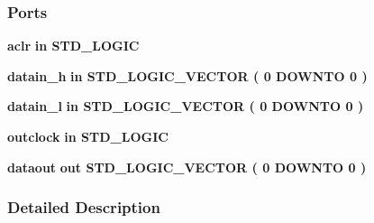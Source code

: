 \subsubsection*{Ports}
 \begin{DoxyCompactItemize}
\item 
{\bf aclr}  {\bfseries {\bfseries \textcolor{keywordflow}{in}\textcolor{vhdlchar}{ }}} {\bfseries \textcolor{comment}{S\+T\+D\+\_\+\+L\+O\+G\+IC}\textcolor{vhdlchar}{ }} 
\item 
{\bf datain\+\_\+h}  {\bfseries {\bfseries \textcolor{keywordflow}{in}\textcolor{vhdlchar}{ }}} {\bfseries \textcolor{comment}{S\+T\+D\+\_\+\+L\+O\+G\+I\+C\+\_\+\+V\+E\+C\+T\+OR}\textcolor{vhdlchar}{ }\textcolor{vhdlchar}{(}\textcolor{vhdlchar}{ }\textcolor{vhdlchar}{ } \textcolor{vhdldigit}{0} \textcolor{vhdlchar}{ }\textcolor{keywordflow}{D\+O\+W\+N\+TO}\textcolor{vhdlchar}{ }\textcolor{vhdlchar}{ } \textcolor{vhdldigit}{0} \textcolor{vhdlchar}{ }\textcolor{vhdlchar}{)}\textcolor{vhdlchar}{ }} 
\item 
{\bf datain\+\_\+l}  {\bfseries {\bfseries \textcolor{keywordflow}{in}\textcolor{vhdlchar}{ }}} {\bfseries \textcolor{comment}{S\+T\+D\+\_\+\+L\+O\+G\+I\+C\+\_\+\+V\+E\+C\+T\+OR}\textcolor{vhdlchar}{ }\textcolor{vhdlchar}{(}\textcolor{vhdlchar}{ }\textcolor{vhdlchar}{ } \textcolor{vhdldigit}{0} \textcolor{vhdlchar}{ }\textcolor{keywordflow}{D\+O\+W\+N\+TO}\textcolor{vhdlchar}{ }\textcolor{vhdlchar}{ } \textcolor{vhdldigit}{0} \textcolor{vhdlchar}{ }\textcolor{vhdlchar}{)}\textcolor{vhdlchar}{ }} 
\item 
{\bf outclock}  {\bfseries {\bfseries \textcolor{keywordflow}{in}\textcolor{vhdlchar}{ }}} {\bfseries \textcolor{comment}{S\+T\+D\+\_\+\+L\+O\+G\+IC}\textcolor{vhdlchar}{ }} 
\item 
{\bf dataout}  {\bfseries {\bfseries \textcolor{keywordflow}{out}\textcolor{vhdlchar}{ }}} {\bfseries \textcolor{comment}{S\+T\+D\+\_\+\+L\+O\+G\+I\+C\+\_\+\+V\+E\+C\+T\+OR}\textcolor{vhdlchar}{ }\textcolor{vhdlchar}{(}\textcolor{vhdlchar}{ }\textcolor{vhdlchar}{ } \textcolor{vhdldigit}{0} \textcolor{vhdlchar}{ }\textcolor{keywordflow}{D\+O\+W\+N\+TO}\textcolor{vhdlchar}{ }\textcolor{vhdlchar}{ } \textcolor{vhdldigit}{0} \textcolor{vhdlchar}{ }\textcolor{vhdlchar}{)}\textcolor{vhdlchar}{ }} 
\end{DoxyCompactItemize}


\subsubsection{Detailed Description}


